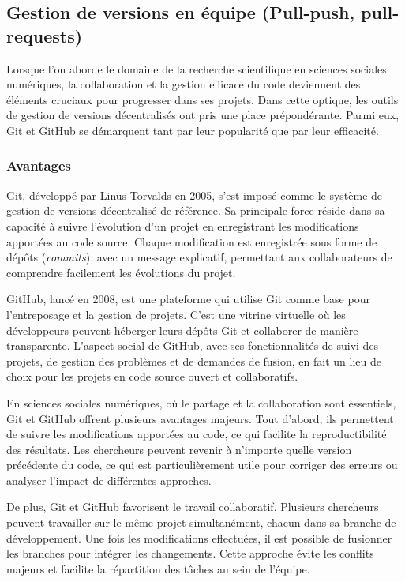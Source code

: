 \documentclass[
  letterpaper,
  DIV=11,
  numbers=noendperiod]{scrreprt}
\begin{document}
\subsection{Gestion de versions en équipe (Pull-push,
pull-requests)}\label{gestion-de-versions-en-uxe9quipe-pull-push-pull-requests}

Lorsque l'on aborde le domaine de la recherche scientifique en sciences
sociales numériques, la collaboration et la gestion efficace du code
deviennent des éléments cruciaux pour progresser dans ses projets. Dans
cette optique, les outils de gestion de versions décentralisés ont pris
une place prépondérante. Parmi eux, Git et GitHub se démarquent tant par
leur popularité que par leur efficacité.

\subsubsection{Avantages}\label{avantages}

Git, développé par Linus Torvalds en 2005, s'est imposé comme le système
de gestion de versions décentralisé de référence. Sa principale force
réside dans sa capacité à suivre l'évolution d'un projet en enregistrant
les modifications apportées au code source. Chaque modification est
enregistrée sous forme de dépôts (\emph{commits}), avec un message
explicatif, permettant aux collaborateurs de comprendre facilement les
évolutions du projet.

GitHub, lancé en 2008, est une plateforme qui utilise Git comme base
pour l'entreposage et la gestion de projets. C'est une vitrine virtuelle
où les développeurs peuvent héberger leurs dépôts Git et collaborer de
manière transparente. L'aspect social de GitHub, avec ses
fonctionnalités de suivi des projets, de gestion des problèmes et de
demandes de fusion, en fait un lieu de choix pour les projets en code
source ouvert et collaboratifs.

En sciences sociales numériques, où le partage et la collaboration sont
essentiels, Git et GitHub offrent plusieurs avantages majeurs. Tout
d'abord, ils permettent de suivre les modifications apportées au code,
ce qui facilite la reproductibilité des résultats. Les chercheurs
peuvent revenir à n'importe quelle version précédente du code, ce qui
est particulièrement utile pour corriger des erreurs ou analyser
l'impact de différentes approches.

De plus, Git et GitHub favorisent le travail collaboratif. Plusieurs
chercheurs peuvent travailler sur le même projet simultanément, chacun
dans sa branche de développement. Une fois les modifications effectuées,
il est possible de fusionner les branches pour intégrer les changements.
Cette approche évite les conflits majeurs et facilite la répartition des
tâches au sein de l'équipe.
\end{document}
